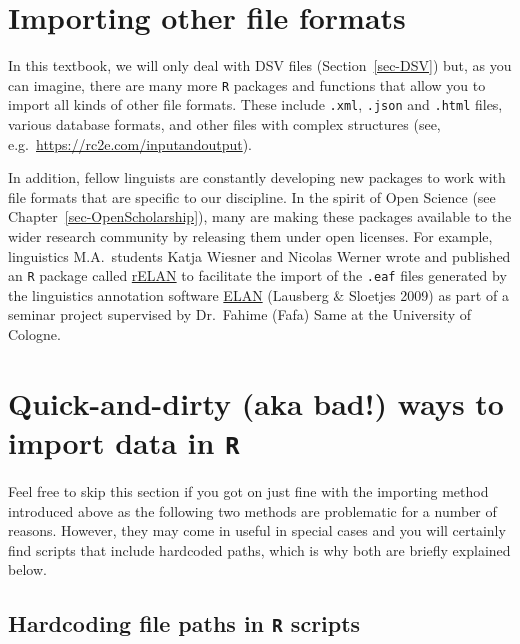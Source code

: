 \documentclass[
  letterpaper,
  DIV=11,
  numbers=noendperiod]{scrreprt}
\begin{document}
\section{Importing other file formats}\label{sec-OtherFileFormats}

In this textbook, we will only deal with DSV files
(Section~\ref{sec-DSV}) but, as you can imagine, there are many more
\texttt{R} packages and functions that allow you to import all kinds of
other file formats. These include \texttt{.xml}, \texttt{.json} and
\texttt{.html} files, various database formats, and other files with
complex structures (see, e.g.~\url{https://rc2e.com/inputandoutput}).

In addition, fellow linguists are constantly developing new packages to
work with file formats that are specific to our discipline. In the
spirit of Open Science (see Chapter~\ref{sec-OpenScholarship}), many are
making these packages available to the wider research community by
releasing them under open licenses. For example, linguistics
M.A.~students Katja Wiesner and Nicolas Werner wrote and published an
\texttt{R} package called
\href{https://github.com/relan-package/rELAN/?tab=readme-ov-file}{rELAN}
to facilitate the import of the \texttt{.eaf} files generated by the
linguistics annotation software
\href{https://archive.mpi.nl/tla/elan}{ELAN} (Lausberg \& Sloetjes 2009)
as part of a seminar project supervised by Dr.~Fahime (Fafa) Same at the
University of Cologne.

\section{\texorpdfstring{Quick-and-dirty (aka bad!) ways to import data
in
\texttt{R}}{Quick-and-dirty (aka bad!) ways to import data in R}}\label{quick-and-dirty-aka-bad-ways-to-import-data-in-r}

Feel free to skip this section if you got on just fine with the
importing method introduced above as the following two methods are
problematic for a number of reasons. However, they may come in useful in
special cases and you will certainly find scripts that include hardcoded
paths, which is why both are briefly explained below.

\subsection{\texorpdfstring{Hardcoding file paths in \texttt{R}
scripts~}{Hardcoding file paths in R scripts~}}\label{sec-HardcodingFilePaths}
\end{document}
